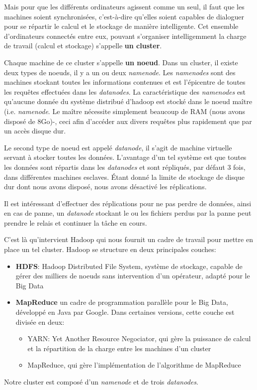 Mais pour que les différents ordinateurs agissent comme un seul, il faut que les machines soient synchronisées, c'est-à-dire qu'elles soient capables de dialoguer pour se répartir le calcul et le stockage de manière intelligente. Cet ensemble d'ordinateurs connectés entre eux, pouvant s'organiser intelligemment la charge  de travail (calcul et stockage) s'appelle \textbf{un cluster}.\par
Chaque machine de ce cluster s'appelle \textbf{un noeud}. Dans un cluster, il existe deux types de noeuds, il y a un ou deux \textit{namenode}. Les \textit{namenodes} sont des machines stockant toutes les informations contenues et est l'épicentre de toutes les requêtes effectuées dans les \textit{datanodes}. La caractéristique des \textit{namenodes} est qu'aucune donnée du système distribué d'hadoop est stocké dans le noeud maître (i.e. \textit{namenode}. Le maître nécessite simplement beaucoup de RAM (nous avons disposé de 8Go)-, ceci afin d'accéder aux divers requêtes plus rapidement que par un accès disque dur.\par
Le second type de noeud est appelé \textit{datanode}, il s'agit de machine virtuelle servant à stocker toutes les données. L'avantage d'un tel système est que toutes les données sont répartis dans les \textit{datanodes} et sont répliqués, par défaut 3 fois, dans différentes machines esclaves. \'Etant donné la limite de stockage de disque dur dont nous avons disposé, nous avons désactivé les réplications.\par
Il est intéressant d'effectuer des réplications pour ne pas perdre de données, ainsi en cas de panne, un \textit{datanode} stockant le ou les fichiers perdus par la panne peut prendre le relais et continuer la tâche en cours.

\noindent C'est là qu'intervient Hadoop qui nous fournit un cadre de travail pour mettre en place un tel cluster. Hadoop se structure en deux principales couches:
\begin{itemize}
\item \textbf{HDFS}: Hadoop Distributed File System, système de stockage, capable de gérer des
 milliers de noeuds sans intervention d'un opérateur, adapté pour le Big Data
\item \textbf{MapReduce} un cadre de programmation parallèle pour le Big Data, développé 
en Java par Google. Dans certaines versions, cette couche est divisée en deux:
\begin{itemize}
\item YARN: Yet Another Resource Negociator, qui gère la puissance de calcul et la répartition de la charge entre les machines d'un cluster
\item MapReduce, qui gère l'implémentation de l'algorithme de MapReduce
\end{itemize}
\end{itemize}
Notre cluster est composé d'un \textit{namenode} et de trois \textit{datanodes}.
